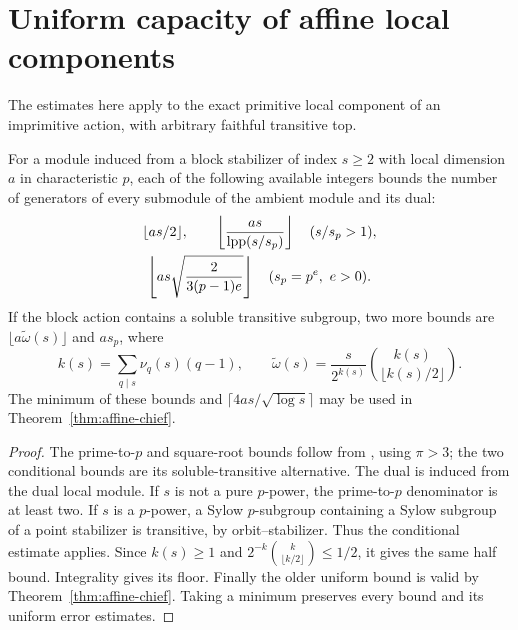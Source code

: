 \section{Uniform capacity of affine local components}
\label{sec:affine-capacity}
The estimates here apply to the exact primitive local component of
an imprimitive action, with arbitrary faithful transitive top.

\begin{lemma}\label{lem:refined-induced-capacity}\label{lem:refined-capacity}
For a module induced from a block stabilizer of index $s\geq2$
with local dimension $a$ in characteristic $p$, each of the following
available integers bounds the number of generators of every submodule
of the ambient module and its dual:
\begin{gather*}
 \lfloor as/2\rfloor,\qquad
 \left\lfloor\frac{as}{\operatorname{lpp}(s/s_p)}\right\rfloor\quad(s/s_p>1),\\
 \left\lfloor as\sqrt{\frac2{3(p-1)e}}\right\rfloor
       \quad(s_p=p^e,\ e>0).
\end{gather*}
If the block action contains a soluble transitive subgroup, two more
bounds are $\lfloor a\widetilde\omega(s)\rfloor$ and $as_p$, where
\[
 k(s)=\sum_{q\mid s}\nu_q(s)(q-1),\qquad
 \widetilde\omega(s)=\frac{s}{2^{k(s)}}
                   \binom{k(s)}{\lfloor k(s)/2\rfloor}.
\]
The minimum of these bounds and
$\lceil4as/\sqrt{\log s}\rceil$ may be used in
Theorem~\ref{thm:affine-chief}.
\end{lemma}
\begin{proof}
The prime-to-$p$ and square-root bounds follow from
\cite[Theorem~1.6, Corollary~4.27]{Tracey2018}, using $\pi>3$;
the two conditional bounds are its soluble-transitive alternative.
The dual is induced from the dual local module. If $s$ is not a
pure $p$-power, the prime-to-$p$ denominator is at least two.
If $s$ is a $p$-power, a Sylow $p$-subgroup containing a Sylow
subgroup of a point stabilizer is transitive, by orbit--stabilizer.
Thus the conditional estimate applies. Since $k(s)\geq1$ and
$2^{-k}\binom{k}{\lfloor k/2\rfloor}\leq1/2$, it gives the
same half bound. Integrality gives its floor. Finally the older
uniform bound is valid by Theorem~\ref{thm:affine-chief}.
Taking a minimum preserves every bound and its uniform error estimates.
\end{proof}

